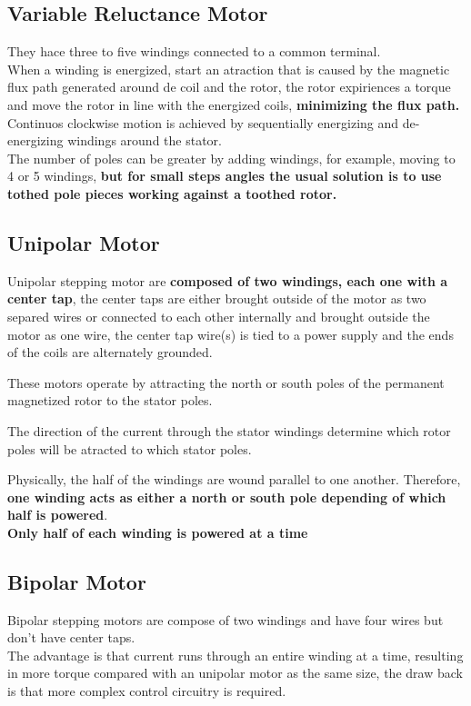 \documentclass{report}
\begin{document}
\subsection*{Variable Reluctance Motor}
They hace three to five windings connected to a common terminal.\\
When a winding is energized, start an atraction that is caused by the magnetic flux path generated around de coil
and the rotor, the rotor expiriences a torque and move the rotor in line with the energized coils, \textbf{minimizing
the flux path.}\\

Continuos clockwise motion is achieved by sequentially energizing and de-energizing windings around the stator.\\

The number of poles can be greater by adding windings, for example, moving to 4 or 5 windings, \textbf{but for small steps angles 
the usual solution is to use tothed pole pieces working against a toothed rotor.}

\subsection*{Unipolar Motor}
Unipolar stepping motor are \textbf{composed of two windings, each one with a center tap}, the center taps are either brought outside
of the motor as two separed wires or connected to each other internally and brought outside the motor as one wire, the center tap wire(s)
is tied to a power supply and the ends of the coils are alternately grounded. 

These motors operate by attracting the north or south poles of the permanent magnetized rotor to the stator poles. 

The direction of the current through the stator windings determine which rotor poles will be atracted to which stator poles.

Physically, the half of the windings are wound parallel to one another. Therefore, \textbf{one winding acts as either a north or 
south pole depending of which half is powered}.\\

\textbf{Only half of each winding is powered at a time}

\subsection*{Bipolar Motor}
Bipolar stepping motors are compose of two windings and have four wires but don't have center taps.\\
The advantage is that current runs through an entire winding at a time, resulting in more torque compared with 
an unipolar motor as the same size, the draw back is that more complex control circuitry is required.\\
\end{document}
